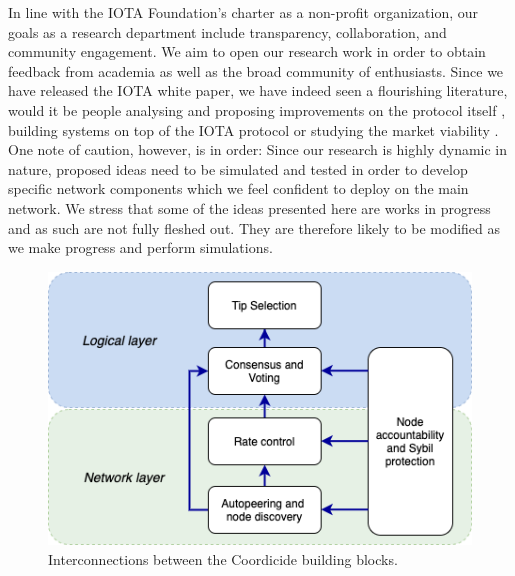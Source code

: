 \documentclass[../main.tex]{subfiles}
\begin{document}
In line with the IOTA Foundation's charter as a non-profit organization, our goals as a research department include transparency, collaboration, and community engagement. We aim to open our research work in order to obtain feedback from academia as well as the broad community of enthusiasts. Since we have released the IOTA white paper, we have indeed seen a flourishing literature, would it be people analysing and proposing improvements on the protocol itself \cite{Attias2019_netys, bramas2019, DeRoode2018, Ince2018, Janecko2018, Stucchi2019}, building systems on top of the IOTA protocol \cite{Brogan2018, Chiang2018, Memon2018, Zhang2019} or studying the market viability \cite{Bartolomeu2018, Dasgupta2019, Florea2018, Raschendorfer2019}. One note of caution, however, is in order: Since our research is highly dynamic in nature, proposed ideas need to be simulated and tested in order to develop specific network components which we feel confident to deploy on the main network. We stress that some of the ideas presented here are works in progress and as such are not fully fleshed out. They are therefore likely to be modified as we make progress and perform simulations. 

\begin{figure}
     \centering
     \includegraphics[scale=0.5]{images/building-blocks.png}
     \caption{Interconnections between the Coordicide building blocks.}
     \label{fig:building-blocks}
\end{figure}
\end{document}
